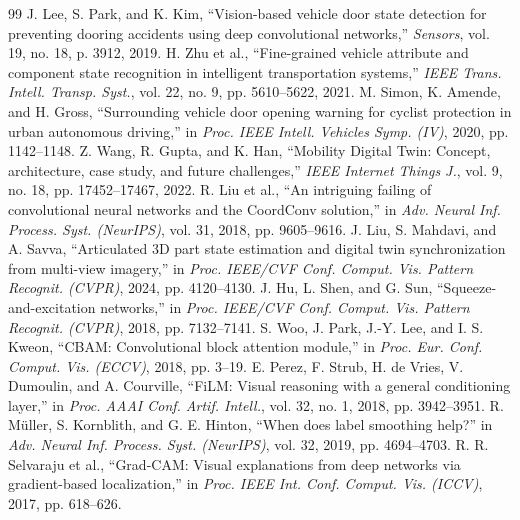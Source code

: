 \documentclass[journal]{IEEEtran}
\begin{document}
\begin{thebibliography}{99}
 J. Lee, S. Park, and K. Kim, ``Vision-based vehicle door state detection for preventing dooring accidents using deep convolutional networks,'' \emph{Sensors}, vol. 19, no. 18, p. 3912, 2019.
 H. Zhu et al., ``Fine-grained vehicle attribute and component state recognition in intelligent transportation systems,'' \emph{IEEE Trans. Intell. Transp. Syst.}, vol. 22, no. 9, pp. 5610--5622, 2021.
 M. Simon, K. Amende, and H. Gross, ``Surrounding vehicle door opening warning for cyclist protection in urban autonomous driving,'' in \emph{Proc. IEEE Intell. Vehicles Symp. (IV)}, 2020, pp. 1142--1148.
 Z. Wang, R. Gupta, and K. Han, ``Mobility Digital Twin: Concept, architecture, case study, and future challenges,'' \emph{IEEE Internet Things J.}, vol. 9, no. 18, pp. 17452--17467, 2022.
 R. Liu et al., ``An intriguing failing of convolutional neural networks and the CoordConv solution,'' in \emph{Adv. Neural Inf. Process. Syst. (NeurIPS)}, vol. 31, 2018, pp. 9605--9616.
 J. Liu, S. Mahdavi, and A. Savva, ``Articulated 3D part state estimation and digital twin synchronization from multi-view imagery,'' in \emph{Proc. IEEE/CVF Conf. Comput. Vis. Pattern Recognit. (CVPR)}, 2024, pp. 4120--4130.
 J. Hu, L. Shen, and G. Sun, ``Squeeze-and-excitation networks,'' in \emph{Proc. IEEE/CVF Conf. Comput. Vis. Pattern Recognit. (CVPR)}, 2018, pp. 7132--7141.
 S. Woo, J. Park, J.-Y. Lee, and I. S. Kweon, ``CBAM: Convolutional block attention module,'' in \emph{Proc. Eur. Conf. Comput. Vis. (ECCV)}, 2018, pp. 3--19.
 E. Perez, F. Strub, H. de Vries, V. Dumoulin, and A. Courville, ``FiLM: Visual reasoning with a general conditioning layer,'' in \emph{Proc. AAAI Conf. Artif. Intell.}, vol. 32, no. 1, 2018, pp. 3942--3951.
 R. M{\"u}ller, S. Kornblith, and G. E. Hinton, ``When does label smoothing help?'' in \emph{Adv. Neural Inf. Process. Syst. (NeurIPS)}, vol. 32, 2019, pp. 4694--4703.
 R. R. Selvaraju et al., ``Grad-CAM: Visual explanations from deep networks via gradient-based localization,'' in \emph{Proc. IEEE Int. Conf. Comput. Vis. (ICCV)}, 2017, pp. 618--626.
\end{thebibliography}
\end{document}
